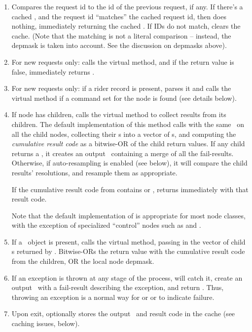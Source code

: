 \documentclass[10pt]{article}
\begin{document}
  \begin{enumerate}
  
  \item Compares the request id to the id of the previous request, if any. If
    there's a cached \Result, and the request id ``matches'' the cached request
    id, then does nothing, immediately returning the cached \Result.  If IDs do
    not match, clears the cache. (Note that the matching is not a literal
    comparison -- instead, the depmask is taken into account. See the discussion
    on depmasks above).

  \item For new requests only: calls the virtual  method,
    and if the return value is false, immediately returns .

  \item For new requests only: if a rider record is present, parses it and 
    calls the virtual  method if a command set for the
    node is found (see details below).

  \item If node has children, calls the virtual  method to
    collect results from its children. The default implementation of this
    method calls  with the same \Request\ on all the child nodes,
    collecting their \Result{}s into a vector of s, and
    computing the {\em cumulative result code} as a bitwise-OR of the child
    return values. If any child returns a , it creates an output
    \Result\ containing a merge of all the fail-results. Otherwise, if
    auto-resampling is enabled (see below), it will compare the child results'
    resolutions, and resample them as appropriate.

    If the cumulative result code from  contains 
    or ,  returns immediately with that result code.  

    Note that the default implementation of  is appropriate
    for most node classes, with the exception of specialized ``control'' nodes
    such as  and .

  \item If a \Cells\ object is present, calls the virtual 
    method, passing in the vector of child \Result{}s returned by
    . Bitwise-ORs the return value with the cumulative
    result code from the children, OR the local node depmask.

  \item If an exception is thrown at any stage of the process, 
    will catch it, create an output \Result\ with a fail-result describing the
    exception, and return . Thus, throwing an exception is a normal
    way for  or  or  to
    indicate failure.

  \item Upon exit, optionally stores the output \Result\ and result code in the
    cache (see caching issues, below).

  \end{enumerate}
\end{document}
